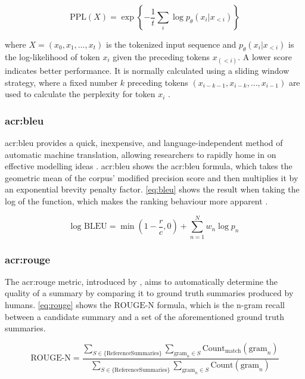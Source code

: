 \begin{equation}
    \text{PPL}(X) = \exp \left\{ -\frac{1}{t} \sum_{i} \log p_\theta(x_i | x_{<i}) \right\}
    \label{eq:ppl}
\end{equation}

\noindent where $X = (x_0, x_1, \ldots, x_t)$ is the tokenized input sequence and $p_\theta(x_i | x_{<i})$ is the log-likelihood of token $x_i$ given the preceding tokens $x_(<i)$. A lower score indicates better performance. It is normally calculated using a sliding window strategy, where a fixed number $k$ preceding tokens $(x_{i-k-1},x_{i-k},\ldots,x_{i-1})$ are used to calculate the perplexity for token $x_i$ \citep{huggingfacePerplexityFixedlengthModels}.

\subsubsection[BiLingual Evaluation Understudy]{\acrfull{acr:bleu}}

\gls{acr:bleu} provides a quick, inexpensive, and language-independent method of automatic machine translation, allowing researchers to rapidly home in on effective modelling ideas \citep{papineniBleuMethodAutomatic2002}. \gls{acr:bleu} shows the \gls{acr:bleu} formula, which takes the geometric mean of the corpus' modified precision score and then multiplies it by an exponential brevity penalty factor. \eqref{eq:bleu} shows the result when taking the log of the function, which makes the ranking behaviour more apparent \citep[5]{papineniBleuMethodAutomatic2002}.

\begin{equation}
    \text{log BLEU} = \min\left(1 - \frac{r}{c}, 0\right) + \sum_{n=1}^{N} w_n \log p_n
    \label{eq:bleu}
\end{equation}

\subsubsection[Recall-Oriented Understudy (ROUGE)]{\acrfull{acr:rouge}}

The \gls{acr:rouge} metric, introduced by \cite{linROUGEPackageAutomatic2004}, aims to automatically determine the quality of a summary by comparing it to ground truth summaries produced by humans. \eqref{eq:rouge} shows the $\text{ROUGE-N}$ formula, which is the n-gram recall between a candidate summary and a set of the aforementioned ground truth summaries.

\begin{equation}
    \text{ROUGE-N} = \frac{
    \sum_{S \in \{\text{ReferenceSummaries}\}}
    \sum_{\text{gram}_n \in S}
    \text{Count}_{\text{match}}(\text{gram}_n)
    }{
    \sum_{S \in \{\text{ReferenceSummaries}\}}
    \sum_{\text{gram}_n \in S}
    \text{Count}(\text{gram}_n)
    }
    \label{eq:rouge}
\end{equation}

